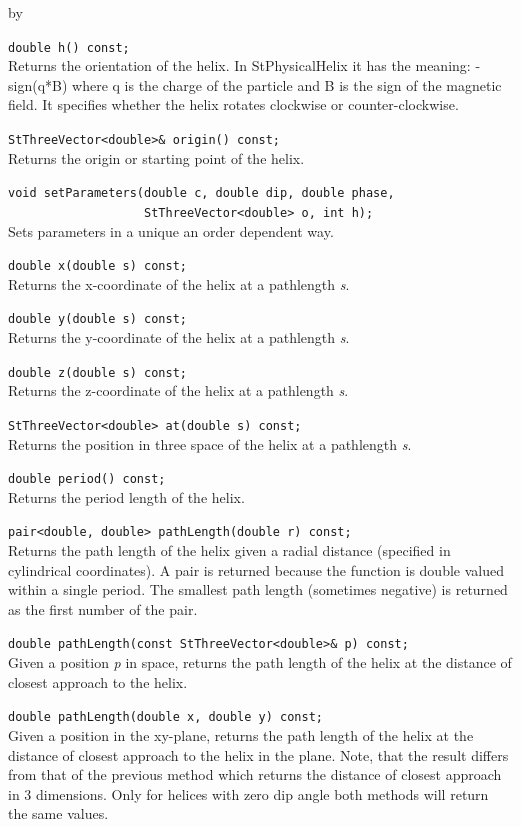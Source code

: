 \documentclass[twoside]{article}
\newcommand{\args}[1]{\textit{#1}}%
\newcommand{\entrylabel}[1]{\mbox{\textbf{{#1}}}\hfil}%
\newenvironment{entry}
{\begin{list}{}%
    {\renewcommand{\makelabel}{\entrylabel}%
     \setlength{\labelwidth}{90pt}%
     \setlength{\leftmargin}{\labelwidth}
     \advance\leftmargin by \labelsep%
      }%
    }%
  {\end{list}}
\newcommand{\Entrylabel}[1]%
{\raisebox{0pt}[1ex][0pt]{\makebox[\labelwidth][l]%
    {\parbox[t]{\labelwidth}{\hspace{0pt}\textbf{{#1}}}}}}
\newenvironment{Entry}%
{\renewcommand{\entrylabel}{\Entrylabel}\begin{entry}}%
  {\end{entry}}
\begin{document}
\begin{Entry}
    \verb+double h() const;+\\
    Returns the orientation of the helix.  In StPhysicalHelix it
    has the meaning: -sign(q*B) where q is the charge of the particle
    and B is the sign of the magnetic field.  It specifies whether
    the helix rotates clockwise or counter-clockwise.
    
    \verb+StThreeVector<double>& origin() const;+\\
    Returns the origin or starting point of the helix.
    
    \verb+void setParameters(double c, double dip, double phase,+\\
    \verb+                   StThreeVector<double> o, int h);+ \\
    Sets parameters in a unique an order dependent way.

    \verb+double x(double s) const;+\\
    Returns the x-coordinate of the helix at a pathlength \args{s}.

    \verb+double y(double s) const;+\\
    Returns the y-coordinate of the helix at a pathlength \args{s}.
    
    \verb+double z(double s) const;+\\
    Returns the z-coordinate of the helix at a pathlength \args{s}.

    \verb+StThreeVector<double> at(double s) const;+\\
    Returns the position in three space of the helix at a pathlength \args{s}.
    
    \verb+double period() const;+\\
    Returns the period length of the helix.

    \verb+pair<double, double> pathLength(double r) const;+\\
    Returns the path length of the helix given a radial distance
    (specified in cylindrical coordinates).  A pair is returned because
    the function is double valued within a single period.  The smallest
    path length (sometimes negative) is returned as the first number of
    the pair.

    \verb+double pathLength(const StThreeVector<double>& p) const;+\\
    Given a position \args{p} in space, returns the path length of the helix
    at the distance of closest approach to the helix.
    
    \verb+double pathLength(double x, double y) const;+\\
    Given a position in the xy-plane, returns the path length of the
    helix at the distance of closest approach to the helix in the
    plane.  Note, that the result differs from that of the previous
    method which returns the distance of closest approach in 3
    dimensions. Only for helices with zero dip angle both methods will
    return the same values.


\end{Entry}
\end{document}
